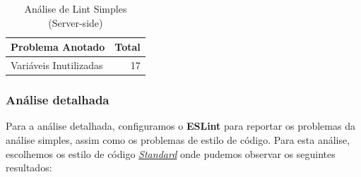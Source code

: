 \documentclass[a4paper,12pt]{article} %
\begin{document}
\vspace{1cm}
\begin{table}[H]
	\centering
	\begin{tabular}{|l|r|}
		\hline
		\textbf{Problema Anotado} & \textbf{Total} \\
		\hline
		Variáveis Inutilizadas & 17 \\
		\hline
	\end{tabular}
	\caption{Análise de Lint Simples (Server-side)}
\end{table}

\subsubsection{Análise detalhada}
Para a análise detalhada, configuramos o \textbf{ESLint} para reportar os problemas da análise simples, assim como os problemas de estilo de código. Para esta análise, escolhemos os estilo de código \hyperlink{https://github.com/standard/standard}{\textit{Standard}} onde pudemos observar os seguintes resultados:
\end{document}
